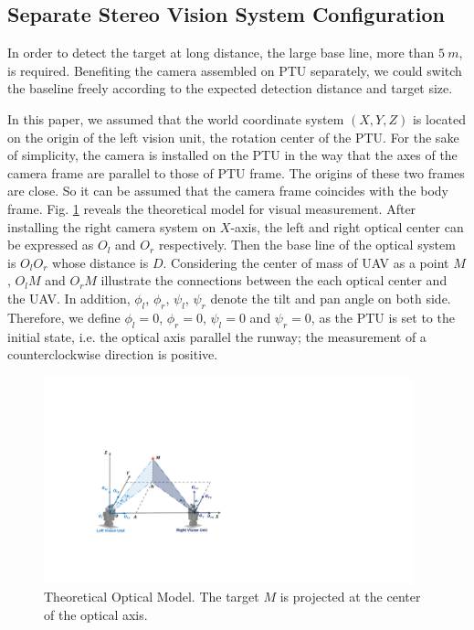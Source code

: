 \subsection{Separate Stereo Vision System Configuration}
In order to detect the target at long distance, the large base line, more than $5\ m $, is required. Benefiting the camera assembled on PTU separately, we could switch the baseline freely according to the expected detection distance and target size.

In this paper, we assumed that the world coordinate system $(X, Y, Z)$ is located on the origin of the left vision unit, the rotation center of the PTU. For the sake of simplicity, the camera is installed on the PTU in the way that the axes of the camera frame are parallel to those of PTU frame. The origins of these two frames are close. So it can be assumed that the camera frame coincides with the body frame. Fig. \ref{fig:TheoreticalModel} reveals the theoretical model for visual measurement. After installing the right camera system on ${X}$-axis, the left and right optical center can be expressed as ${O_l}$ and ${O_r}$ respectively. Then the base line of the optical system is $O_lO_r$ whose distance is ${D}$. Considering the center of mass of UAV as a point ${M}$, ${O_lM}$ and ${O_rM}$ illustrate the connections between the each optical center and the UAV. In addition, ${\phi_l}$, ${\phi_r}$, ${\psi_l}$, ${\psi_r}$ denote the tilt and pan angle on both side. Therefore, we define $\phi_l= 0$, $\phi_r=0$, ${\psi_l=0}$ and ${\psi_r=0}$, as the PTU is set to the initial state, i.e. the optical axis parallel the runway; the measurement of a counterclockwise direction is positive.

\begin{figure}[!tb]
	\centering
	\includegraphics[height=6cm]{figs/Fig03_Stereo.pdf}	
	\caption{Theoretical Optical Model. The target $M$ is projected at the center of the optical axis.}
	\label{fig:TheoreticalModel}
\end{figure}



